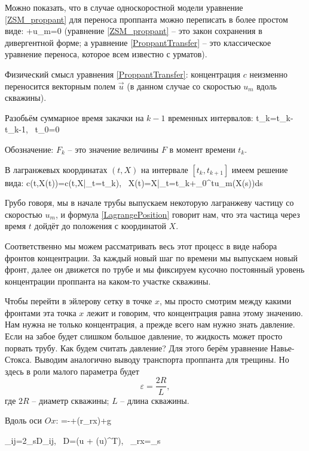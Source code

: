\documentclass[main.tex]{subfiles}
\begin{document}
Можно показать, что в случае односкоростной модели уравнение \eqref{ZSM_proppant} для переноса проппанта можно переписать в более простом виде:
\beq\label{ProppantTransfer}
+u_m=0
\eeq
(уравнение \eqref{ZSM_proppant} -- это закон сохранения в дивергентной форме; а уравнение \eqref{ProppantTransfer} -- это классическое уравнение переноса, которое всем известно с урматов).

Физический смысл уравнения \eqref{ProppantTransfer}: концентрация $c$ неизменно переносится векторным полем $\vec{u}$ (в данном случае со скоростью $u_m$ вдоль скважины).

Разобьём суммарное время закачки на $k-1$ временных интервалов:
\beq
\Delta t_k=t_k-t_{k-1},\,\,\,\,\,t_0=0
\eeq

Обозначение: $F_k$ -- это значение величины $F$ в момент времени $t_k$.

В лагранжевых координатах $(t,X)$ на интервале $[t_k, t_{k+1}]$ имеем решение вида:
\beq\label{LagrangePosition}
c(t,X(t))=c(t,X|_{t=t_k}),\,\,\,\,\,X(t)=X|_{t=t_k}+\int\limits_{0}^{t}u_m(X(s))ds
\eeq

Грубо говоря, мы в начале трубы выпускаем некоторую лагранжеву частицу со скоростью $u_m$, и формула \eqref{LagrangePosition} говорит нам, что эта частица через время $t$ дойдёт до положения с координатой $X$.

Соответственно мы можем рассматривать весь этот процесс в виде набора фронтов концентрации.
За каждый новый шаг по времени мы выпускаем новый фронт, далее он движется по трубе и мы фиксируем кусочно постоянный уровень концентрации проппанта на каком-то участке скважины.

Чтобы перейти в эйлерову сетку в точке $x$, мы просто смотрим между какими фронтами эта точка $x$ лежит и говорим, что концентрация равна этому значению.
\\

Нам нужна не только концентрация, а прежде всего нам нужно знать давление.
Если на забое будет слишком большое давление, то жидкость может просто порвать трубу.
Как будем считать давление?
Для этого берём уравнение Навье-Стокса.
Выводим аналогично выводу транспорта проппанта для трещины.
Но здесь в роли малого параметра будет
$$\varepsilon=\frac{2R}{L},$$
где $2R$ -- диаметр скважины; $L$ -- длина скважины.

Вдоль оси $Ox$:
=-+\left(r\tau_{rx}\right)+\rho g\sin\theta
\eeq

\beq
\tau_{ij}=2\mu_sD_{ij},\,\,\,\,\,D=\left(\nabla u + (\nabla u)^T\right),\,\,\,\,\,\tau_{rx}=\mu_s
\eeq
\end{document}
